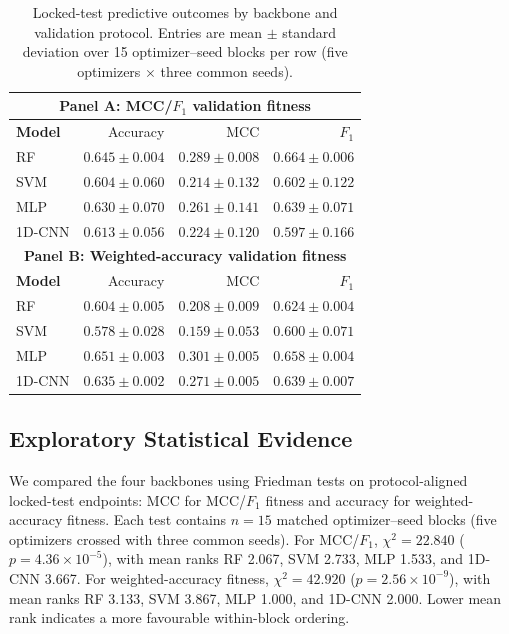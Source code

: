 \begin{table}[!htbp]
\centering
\caption{Locked-test predictive outcomes by backbone and validation protocol. Entries are mean $\pm$ standard deviation over 15 optimizer--seed blocks per row (five optimizers $\times$ three common seeds).}
\label{tab:predictive_summary}
\manuscripttablestyle
\begin{tabular}{lrrr}\toprule
\multicolumn{4}{c}{\textbf{Panel A: MCC/$F_1$ validation fitness}}\\\midrule
\textbf{Model} & Accuracy & MCC & $F_1$\\\midrule
RF & $0.645\pm0.004$ & $0.289\pm0.008$ & $0.664\pm0.006$\\
SVM & $0.604\pm0.060$ & $0.214\pm0.132$ & $0.602\pm0.122$\\
MLP & $0.630\pm0.070$ & $0.261\pm0.141$ & $0.639\pm0.071$\\
1D-CNN & $0.613\pm0.056$ & $0.224\pm0.120$ & $0.597\pm0.166$\\\midrule
\multicolumn{4}{c}{\textbf{Panel B: Weighted-accuracy validation fitness}}\\\midrule
\textbf{Model} & Accuracy & MCC & $F_1$\\\midrule
RF & $0.604\pm0.005$ & $0.208\pm0.009$ & $0.624\pm0.004$\\
SVM & $0.578\pm0.028$ & $0.159\pm0.053$ & $0.600\pm0.071$\\
MLP & $0.651\pm0.003$ & $0.301\pm0.005$ & $0.658\pm0.004$\\
1D-CNN & $0.635\pm0.002$ & $0.271\pm0.005$ & $0.639\pm0.007$\\\bottomrule
\end{tabular}
\end{table}

\subsection{Exploratory Statistical Evidence}

We compared the four backbones using Friedman tests on protocol-aligned locked-test endpoints: MCC for MCC/$F_1$ fitness and accuracy for weighted-accuracy fitness. Each test contains $n=15$ matched optimizer--seed blocks (five optimizers crossed with three common seeds). For MCC/$F_1$, $\chi^2=22.840$ ($p=4.36\times10^{-5}$), with mean ranks RF 2.067, SVM 2.733, MLP 1.533, and 1D-CNN 3.667. For weighted-accuracy fitness, $\chi^2=42.920$ ($p=2.56\times10^{-9}$), with mean ranks RF 3.133, SVM 3.867, MLP 1.000, and 1D-CNN 2.000. Lower mean rank indicates a more favourable within-block ordering.

